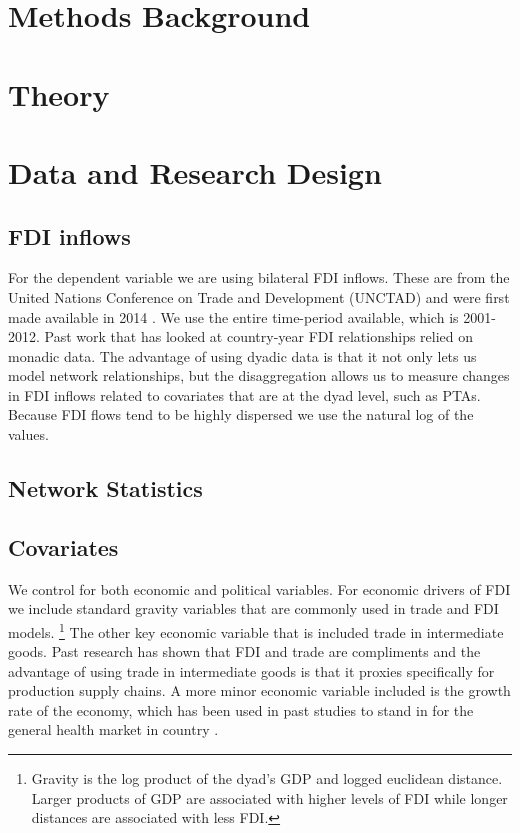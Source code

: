 \documentclass{article}
\begin{document}
\section{Methods Background}

\section{Theory}

\section{Data and Research Design}

\subsection{FDI inflows}

For the dependent variable we are using bilateral FDI inflows. These are from the United Nations Conference on Trade and Development (UNCTAD) and were first made available in 2014 \cite{UNCTAD}. We use the entire time-period available, which is 2001-2012. Past work that has looked at country-year FDI relationships relied on monadic data. The advantage of using dyadic data is that it not only lets us model network relationships, but the disaggregation allows us to measure changes in FDI inflows related to covariates that are at the dyad level, such as PTAs. Because FDI flows tend to be highly dispersed we use the natural log of the values. 

\subsection{Network Statistics}

\subsection{Covariates}

We control for both economic and political variables. For economic drivers of FDI we include standard gravity variables that are commonly used in trade and FDI models\cite{MZ2011,WB1}. \footnote{Gravity is the log product of the dyad's GDP and logged euclidean distance. Larger products of GDP are associated with higher levels of FDI while longer distances are associated with less FDI.} The other key economic variable that is included trade in intermediate goods\cite{OECD}. Past research has shown that FDI and trade are compliments \cite{AN} and the advantage of using trade in intermediate goods is that it proxies specifically for production supply chains. A more minor economic variable included is the growth rate of the economy, which has been used in past studies to stand in for the general health market in country \cite{WB2}.
\end{document}
